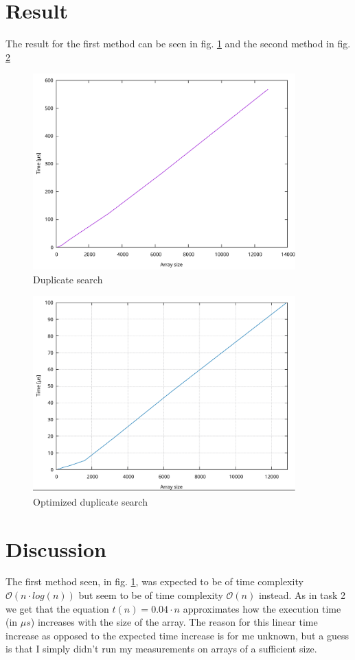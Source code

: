 \documentclass[a4paper,11pt]{article}
\begin{document}
\section*{Result}
The result for the first method can be seen in fig. \ref{fig:duplicateSearch} and the second method
in fig. \ref{fig:betterDuplicate}
\begin{figure}[h!]
  \centering
  \includegraphics[width=0.9\textwidth]{duplicateSearch.pdf}
  \caption{Duplicate search}
  \label{fig:duplicateSearch}
\end{figure}

\begin{figure}[h!]
  \centering
  \includegraphics[width=0.9\textwidth]{betterDuplicateSearch.pdf}
  \caption{Optimized duplicate search}
  \label{fig:betterDuplicate}
\end{figure}
\section*{Discussion}
The first method seen, in fig. \ref{fig:duplicateSearch}, was expected to be of time complexity
$\mathcal{O}(n\cdot log(n))$ but seem to be of time complexity $\mathcal{O}(n)$ instead. As in task 2
we get that the equation $t(n)=0.04\cdot n$ approximates how the execution time (in $\mu s$) increases with the
size of the array. The reason for this linear time increase as opposed to the expected time increase
is for me unknown, but a guess is that I simply didn't run my measurements on arrays of a sufficient
size.
\end{document}
